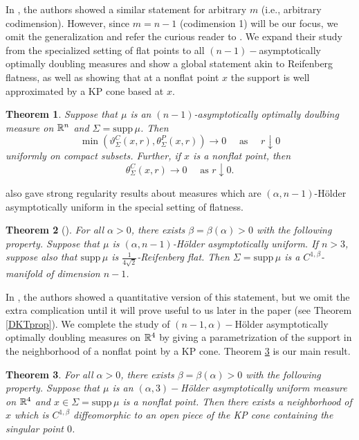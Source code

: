 \documentclass[11pt]{article}
\newtheorem{theorem}{Theorem}[section]
\theoremstyle{definition}
\numberwithin{equation}{section}
\newcommand{\supp}{\mathrm{supp\,}}
\begin{document}
In \cite{DKT}, the authors showed a similar statement for arbitrary $m$ (i.e., arbitrary codimension). However, since $m=n-1$ (codimension 1) will be our focus, we omit the generalization and refer the curious reader to \cite{DKT}. We expand their study from the specialized setting of flat points to all $(n-1)-$asymptotically optimally doubling measures and show a global statement akin to Reifenberg flatness, as well as showing that at a nonflat point $x$ the support is well approximated by a KP cone based at $x$.

\begin{theorem}\label{introAOD}
Suppose that $\mu$ is an $(n-1)$-asymptotically optimally doulbing measure on $\mathbb{R}^n$ and $\Sigma = \supp\mu$. Then 
$$\min(\vartheta_\Sigma^C(x,r),\theta_\Sigma^P(x,r))\to 0\quad\mbox{ as }\quad r\downarrow 0$$
uniformly on compact subsets. Further, if $x$ is a nonflat point, then
$$\theta_\Sigma^C(x,r)\to 0\quad\mbox{ as } r\downarrow 0.$$
\end{theorem}

\cite{DKT} also gave strong regularity results about measures which are $(\alpha,n-1)$-H\"older asymptotically uniform in the special setting of flatness.

\begin{theorem}[\cite{DKT}]\label{DKThaod}
For all $\alpha>0$, there exists $\beta = \beta(\alpha)>0$ with the following property. Suppose that $\mu$ is $(\alpha,n-1)$-H\"older asymptotically uniform. If $n>3$, suppose also that $\supp\mu$ is $\frac 1{4\sqrt 2}$-Reifenberg flat. Then $\Sigma = \supp\mu$ is a $C^{1,\beta}$-manifold of dimension $n-1$.
\end{theorem}

In \cite{DKT}, the authors showed a quantitative version of this statement, but we omit the extra complication until it will prove useful to us later in the paper (see Theorem \ref{DKTprop}). We complete the study of $(n-1,\alpha)-$H\"older asymptotically optimally doubling measures on $\mathbb{R}^4$ by giving a parametrization of the support in the neighborhood of a nonflat point by a KP cone. Theorem \ref{introHAOD} is our main result.

\begin{theorem}\label{introHAOD}
For all $\alpha>0$, there exists $\beta = \beta(\alpha)>0$ with the following property. Suppose that $\mu$ is an $(\alpha,3)-$H\"older asymptotically uniform measure on $\mathbb{R}^4$ and $x\in\Sigma = \supp \mu$ is a nonflat point. Then there exists a neighborhood of $x$ which is $C^{1,\beta}$ diffeomorphic to an open piece of the KP cone containing the singular point $0$.
\end{theorem}
\end{document}
